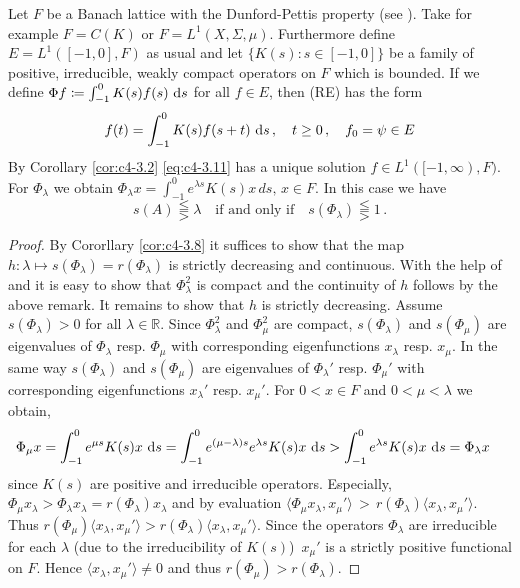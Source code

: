 \begin{example}\label{ex:c4-3.10}
Let $F$ be a Banach lattice with the Dunford-Pettis property (see \citet[Section II.9]{schaefer:1974}).
Take for example $F = C(K)$ or $F = L^{1}(X, \Sigma, \mu)$.
Furthermore define $E = L^{1}([-1,0],F)$ as usual and let $\{K(s) : s \in [-1,0]\}$ be a family of positive, irreducible, weakly compact operators on $F$ which is bounded.
If we define $\Phi f \coloneqq \int_{-1}^{0} K(s)f(s) \, \mathop{}\!\mathrm{d}{s}$ for all $f \in E$, then (RE) has the form
\begin{equation}\label{eq:c4-3.11}
f(t) = \int_{-1}^{0} K(s)f(s+t) \, \mathop{}\!\mathrm{d}{s} \,, \quad t \geq 0 \,,\quad f_{0} = \psi \in E
\end{equation}
By Corollary \ref{cor:c4-3.2} \quad \eqref{eq:c4-3.11} has a unique solution $f \in L^{1}([-1,\infty),F)$.
For $\Phi_{\lambda}$ we obtain $\Phi_{\lambda}x = \int_{-1}^{0} e^{\lambda s}K(s)x \, ds,\, x \in F$.
In this case we have 
\[
s(A) \lesseqqgtr \lambda \quad \text{if and only if} \quad s(\Phi_{\lambda}) \lesseqqgtr 1 \,.
\]
\end{example}

\begin{proof}
By Cororllary \ref{cor:c4-3.8} it suffices to show that the map $h : \lambda \mapsto s(\Phi_{\lambda}) = r(\Phi_{\lambda})$ is strictly decreasing and continuous.
With the help of \citet[Theorem III.11.4]{schaefer:1966} and \citet[Theorem II.9.9]{schaefer:1974} it is easy to show that $\Phi_{\lambda}^{2}$ is compact and the continuity of $h$ follows by the above remark.
It remains to show that $h$ is strictly decreasing.
Assume $s(\Phi_{\lambda}) > 0$ for all $\lambda \in \mathbb{R}$.
Since $\Phi_{\lambda}^{2}$ and $\Phi_{\mu}^{2}$ are compact, $s(\Phi_{\lambda})$ and $s(\Phi_{\mu})$ are eigenvalues of $\Phi_{\lambda}$ resp. $\Phi_{\mu}$ with corresponding eigenfunctions $x_{\lambda}$ resp. $x_{\mu}$.
In the same way $s(\Phi_{\lambda})$ and $s(\Phi_{\mu})$ are eigenvalues of $\Phi_{\lambda}'$ resp. $\Phi_{\mu}'$ with corresponding eigenfunctions $x_{\lambda}'$ resp. $x_{\mu}'$.
For $0 < x \in F$ and $0 < \mu < \lambda$ we obtain,
\begin{align*}
\Phi_{\mu}x &= \int_{-1}^{0} e^{\mu s}K(s)x \, \mathop{}\!\mathrm{d}{s} = \int_{-1}^{0} e^{(\mu-\lambda) s}e^{\lambda s}K(s)x \, \mathop{}\!\mathrm{d}{s} > \int_{-1}^{0} e^{\lambda s}K(s)x \, \mathop{}\!\mathrm{d}{s} = \Phi_{\lambda}x
\end{align*}
since $K(s)$ are positive and irreducible operators.
Especially, $\Phi_{\mu}x_{\lambda} > \Phi_{\lambda}x_{\lambda} = r(\Phi_{\lambda})x_{\lambda}$ and by evaluation $\langle\Phi_{\mu}x_{\lambda},x_{\mu}'\rangle \,>\, r(\Phi_{\lambda})\langle x_{\lambda},x_{\mu}'\rangle$.
Thus $r(\Phi_{\mu})\langle x_{\lambda},x_{\mu}'\rangle > r(\Phi_{\lambda})\langle x_{\lambda},x_{\mu}'\rangle$.
Since the operators $\Phi_{\lambda}$ are irreducible for each $\lambda$ (due to the irreducibility of $K(s)$)\, $x_{\mu}'$ is a strictly positive functional on $F$.
Hence $\langle x_{\lambda},x_{\mu}'\rangle \neq 0$ and thus $r(\Phi_{\mu}) > r(\Phi_{\lambda})$.
\end{proof}


